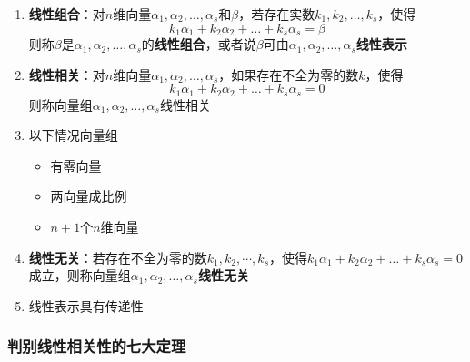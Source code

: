 \documentclass[./linear_algebra.tex]{subfiles}
\begin{document}
    \begin{enumerate}
        \item \textbf{线性组合}：对$n$维向量$\alpha_1, \alpha_2, \dots, \alpha_s$和$\beta$，若存在实数$k_1, k_2, \dots, k_s$，使得
        \[
            k_{1}\alpha_1 + k_{2}\alpha_2 + \dots + k_{s}\alpha_s = \beta
        \]
        则称$\beta$是$\alpha_1, \alpha_2, \dots, \alpha_s$的\textbf{线性组合}，或者说$\beta$可由$\alpha_1, \alpha_2, \dots, \alpha_s$\textbf{线性表示}
        \item \textbf{线性相关}：对$n$维向量$\alpha_1, \alpha_2, \dots, \alpha_s$，如果存在不全为零的数$k$，使得
        \[
            k_{1}\alpha_1 + k_{2}\alpha_2 + \dots + k_{s}\alpha_s = 0
        \]
        则称向量组$\alpha_1, \alpha_2, \dots, \alpha_s$线性相关
        \item 以下情况向量组{\color{red}{必线性相关}}
        \begin{itemize}
            \item 有零向量
            \item 两向量成比例
            \item $n+1$个$n$维向量
        \end{itemize}
        \item \textbf{线性无关}：若存在不全为零的数$k_1, k_2, \cdots, k_s$，使得$k_{1}\alpha_1 + k_{2}\alpha_2 + \dots + k_{s}\alpha_s = 0$成立，则称向量组$\alpha_1, \alpha_2, \dots, \alpha_s$\textbf{线性无关}
        \item 线性表示具有传递性
    \end{enumerate}

    \subsubsection{判别线性相关性的七大定理}
\end{document}

